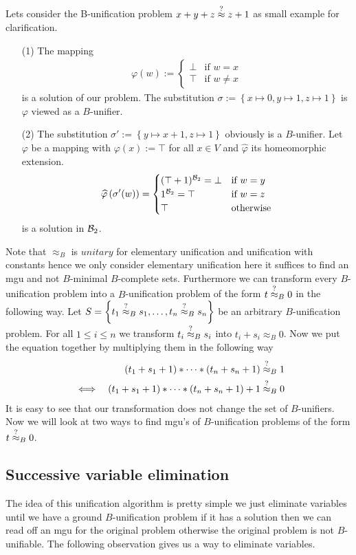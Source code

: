 		Lets consider the B-unification problem $x+y+z\stackrel{?}{\approx} z+1$ as small example for clarification.
		\begin{itemize}
		\item[(1)]The mapping 
		\begin{align*}
		\varphi(w):=\begin{cases}
		\bot& \text{if }w=x\\
		\top& \text{if }w\neq x
		\end{cases}
		\end{align*}is a solution of our problem. The substitution $\sigma:=\left\lbrace x\mapsto0,y\mapsto1,z\mapsto1\right\rbrace$ is $\varphi$ viewed as a $B$-unifier.
		\item[(2)]The substitution $\sigma':=\left\lbrace y\mapsto x+1,z\mapsto 1\right\rbrace $ obviously is a $B$-unifier. Let $\varphi$ be a mapping with $\varphi(x):=\top$ for all $x\in V$ and $\widehat{\varphi}$ its homeomorphic extension.
		\begin{align*}
		\widehat{\varphi}\left(\sigma'(w)\right)=\begin{cases}
		(\top+1)^{\mathcal{B}_2}=\bot& \text{if } w=y\\
		1^{\mathcal{B}_2}=\top& \text{if } w=z\\
		\top&  \text{otherwise}
		\end{cases}
		\end{align*}
		is a solution in ${\mathcal{B}_2}$.
		\end{itemize}
		Note that $\approx_B$ is $unitary$ for elementary unification and unification with constants hence we only consider elementary unification here it suffices to find an mgu and not $B$-minimal $B$-complete sets. Furthermore we can transform every $B$-unification problem into a $B$-unification problem of the form $t\stackrel{?}{\approx}_B0$ in the following way. Let $S=\left\lbrace t_1\stackrel{?}{\approx}_Bs_1,\dots,t_n\stackrel{?}{\approx}_Bs_n\right\rbrace$ be an arbitrary $B$-unification problem. For all $1\leq i\leq n$ we transform $t_i\stackrel{?}{\approx}_Bs_i$ into $t_i+s_i\approx_B0$. Now we put the equation together by multiplying them in the following way 
		\begin{align*}
		&&(t_1+s_1+1)*\dots*(t_n+s_n+1)&\stackrel{?}{\approx}_B1\\
		&\iff&(t_1+s_1+1)*\dots*(t_n+s_n+1)+1&\stackrel{?}{\approx}_B0
		\end{align*}
		It is easy to see that our transformation does not change the set of $B$-unifiers. Now we will look at two ways to find mgu's of $B$-unification problems of the form $t\stackrel{?}{\approx}_B0$.
		\subsection{Successive variable elimination}
		The idea of this unification algorithm is pretty simple we just eliminate variables until we have a ground $B$-unification problem if it has a solution then we can read off an mgu for the original problem otherwise the original problem is not $B$-unifiable. The following observation gives us a way to eliminate variables.
		
